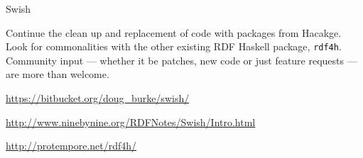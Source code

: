 \begin{hcarentry}[updated]{Swish}
\FuturePlans

Continue the clean up and replacement of code with packages from
Hacakge. Look for commonalities with the other existing RDF Haskell package,
{\tt rdf4h}.
Community input --- whether it be patches, new code or just feature
requests --- are more than welcome.
 
\FurtherReading
\begin{compactitem}
\item \url{https://bitbucket.org/doug_burke/swish/}
\item \url{http://www.ninebynine.org/RDFNotes/Swish/Intro.html}
\item \url{http://protempore.net/rdf4h/}
\end{compactitem}
\end{hcarentry}

